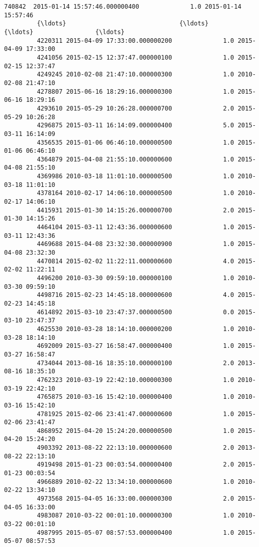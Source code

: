 \documentclass[11pt]{article}
\begin{document}
\begin{Verbatim}[commandchars=\\\{\}]
         740842  2015-01-14 15:57:46.000000400              1.0 2015-01-14 15:57:46   
         {\ldots}                               {\ldots}              {\ldots}                 {\ldots}   
         4220311 2015-04-09 17:33:00.000000200              1.0 2015-04-09 17:33:00   
         4241056 2015-02-15 12:37:47.000000100              1.0 2015-02-15 12:37:47   
         4249245 2010-02-08 21:47:10.000000300              1.0 2010-02-08 21:47:10   
         4278807 2015-06-16 18:29:16.000000300              1.0 2015-06-16 18:29:16   
         4293610 2015-05-29 10:26:28.000000700              2.0 2015-05-29 10:26:28   
         4296875 2015-03-11 16:14:09.000000400              5.0 2015-03-11 16:14:09   
         4356535 2015-01-06 06:46:10.000000500              1.0 2015-01-06 06:46:10   
         4364879 2015-04-08 21:55:10.000000600              1.0 2015-04-08 21:55:10   
         4369986 2010-03-18 11:01:10.000000500              1.0 2010-03-18 11:01:10   
         4378164 2010-02-17 14:06:10.000000500              1.0 2010-02-17 14:06:10   
         4415931 2015-01-30 14:15:26.000000700              2.0 2015-01-30 14:15:26   
         4464104 2015-03-11 12:43:36.000000600              1.0 2015-03-11 12:43:36   
         4469688 2015-04-08 23:32:30.000000900              1.0 2015-04-08 23:32:30   
         4470814 2015-02-02 11:22:11.000000600              4.0 2015-02-02 11:22:11   
         4496200 2010-03-30 09:59:10.000000100              1.0 2010-03-30 09:59:10   
         4498716 2015-02-23 14:45:18.000000600              4.0 2015-02-23 14:45:18   
         4614892 2015-03-10 23:47:37.000000500              0.0 2015-03-10 23:47:37   
         4625530 2010-03-28 18:14:10.000000200              1.0 2010-03-28 18:14:10   
         4692009 2015-03-27 16:58:47.000000400              1.0 2015-03-27 16:58:47   
         4734044 2013-08-16 18:35:10.000000100              2.0 2013-08-16 18:35:10   
         4762323 2010-03-19 22:42:10.000000300              1.0 2010-03-19 22:42:10   
         4765875 2010-03-16 15:42:10.000000400              1.0 2010-03-16 15:42:10   
         4781925 2015-02-06 23:41:47.000000600              1.0 2015-02-06 23:41:47   
         4868952 2015-04-20 15:24:20.000000500              1.0 2015-04-20 15:24:20   
         4903392 2013-08-22 22:13:10.000000600              2.0 2013-08-22 22:13:10   
         4919498 2015-01-23 00:03:54.000000400              2.0 2015-01-23 00:03:54   
         4966889 2010-02-22 13:34:10.000000600              1.0 2010-02-22 13:34:10   
         4973568 2015-04-05 16:33:00.000000300              2.0 2015-04-05 16:33:00   
         4983087 2010-03-22 00:01:10.000000300              1.0 2010-03-22 00:01:10   
         4987995 2015-05-07 08:57:53.000000400              1.0 2015-05-07 08:57:53   
         

\end{Verbatim}
\end{document}
